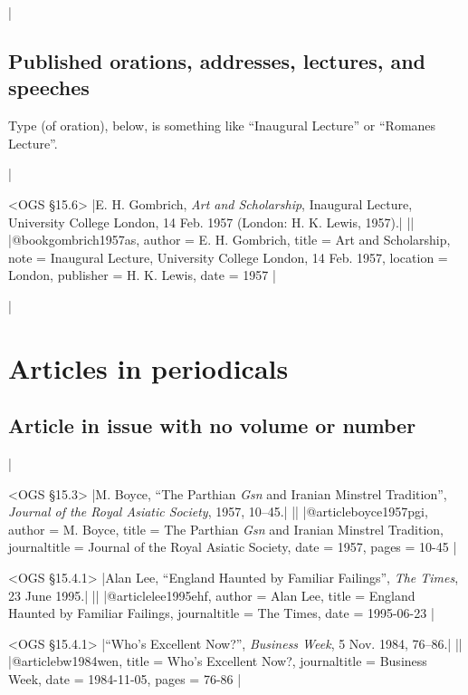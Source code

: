 \documentclass[extrafontsizes,11pt,a4paper,oneside]{memoir}
\begin{document}
\todoc|
\section{Published orations, addresses, lectures, and speeches}

Type (of oration), below, is something like \enquote{Inaugural Lecture} or \enquote{Romanes Lecture}.

|

\bibexample<OGS \S15.6>
|E. H. Gombrich, \emph{Art and Scholarship}, Inaugural Lecture, University College London, 14 Feb. 1957 (London: H. K. Lewis, 1957).|%
||%
|@book{gombrich1957as,
  author = {E. H. Gombrich},
  title = {Art and Scholarship},
  note = {Inaugural Lecture, University College London, 14 Feb. 1957},
  location = {London},
  publisher = {H. K. Lewis},
  date = {1957}
}|

\todoc|
\chapter{Articles in periodicals}\label{sec:article}

\section{Article in issue with no volume or number}

|

\bibexample<OGS \S15.3>
|M. Boyce, \enquote{The Parthian \emph{Gsn} and Iranian Minstrel Tradition}, \emph{Journal of the Royal Asiatic Society}, 1957, 10--45.|%
||%
|@article{boyce1957pgi,
  author = {M. Boyce},
  title = {The Parthian \emph{Gsn} and Iranian Minstrel Tradition},
  journaltitle = {Journal of the Royal Asiatic Society},
  date = {1957},
  pages = {10-45}
}|

\bibexample<OGS \S15.4.1>
|Alan Lee, \enquote{England Haunted by Familiar Failings}, \emph{The Times}, 23 June 1995.|%
||%
|@article{lee1995ehf,
  author = {Alan Lee},
  title = {England Haunted by Familiar Failings},
  journaltitle = {The Times},
  date = {1995-06-23}
}|

\bibexample<OGS \S15.4.1>
|\enquote{Who's Excellent Now?}, \emph{Business Week}, 5 Nov. 1984, 76--86.|%
||%
|@article{bw1984wen,
  title = {Who's Excellent Now?},
  journaltitle = {Business Week},
  date = {1984-11-05},
  pages = {76-86}
}|
  
\end{document}
